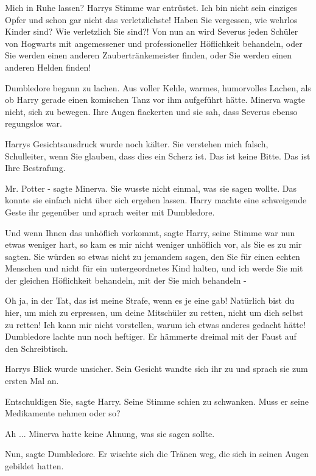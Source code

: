 \glqq Mich in Ruhe lassen?\grqq{} Harrys Stimme war entrüstet. \glqq Ich bin
nicht sein einziges Opfer und schon gar nicht das verletzlichste! Haben Sie
vergessen, wie wehrlos Kinder sind? Wie verletzlich Sie sind?! Von nun an wird
Severus jeden Schüler von Hogwarts mit angemessener und professioneller
Höflichkeit behandeln, oder Sie werden einen anderen Zaubertränkemeister finden,
oder Sie werden einen anderen Helden finden!\grqq{}

Dumbledore begann zu lachen. Aus voller Kehle, warmes, humorvolles Lachen, als
ob Harry gerade einen komischen Tanz vor ihm aufgeführt hätte. Minerva wagte
nicht, sich zu bewegen. Ihre Augen flackerten und sie sah, dass Severus ebenso
regungslos war.

Harrys Gesichtsausdruck wurde noch kälter. \glqq Sie verstehen mich falsch,
Schulleiter, wenn Sie glauben, dass dies ein Scherz ist. Das ist keine Bitte.
Das ist Ihre Bestrafung.\grqq{}

\glqq Mr. Potter -\grqq{} sagte Minerva. Sie wusste nicht einmal, was sie sagen
wollte. Das konnte sie einfach nicht über sich ergehen lassen. Harry machte eine
schweigende Geste ihr gegenüber und sprach weiter mit Dumbledore.

\glqq Und wenn Ihnen das unhöflich vorkommt\grqq{}, sagte Harry, seine Stimme
war nun etwas weniger hart, \glqq so kam es mir nicht weniger unhöflich vor, als
Sie es zu mir sagten. Sie würden so etwas nicht zu jemandem sagen, den Sie für
einen echten Menschen und nicht für ein untergeordnetes Kind halten, und ich
werde Sie mit der gleichen Höflichkeit behandeln, mit der Sie mich behandeln
-\grqq{}

\glqq Oh ja, in der Tat, das ist meine Strafe, wenn es je eine gab! Natürlich
bist du hier, um mich zu erpressen, um deine Mitschüler zu retten, nicht um dich
selbst zu retten! Ich kann mir nicht vorstellen, warum ich etwas anderes gedacht
hätte!\grqq{} Dumbledore lachte nun noch heftiger. Er hämmerte dreimal mit der
Faust auf den Schreibtisch.

Harrys Blick wurde unsicher. Sein Gesicht wandte sich ihr zu und sprach sie zum
ersten Mal an.

\glqq Entschuldigen Sie\grqq{}, sagte Harry. Seine Stimme schien zu schwanken.
\glqq Muss er seine Medikamente nehmen oder so?\grqq{}

\glqq Ah ...\grqq{} Minerva hatte keine Ahnung, was sie sagen sollte.

\glqq Nun\grqq{}, sagte Dumbledore. Er wischte sich die Tränen weg, die sich in
seinen Augen gebildet hatten.

